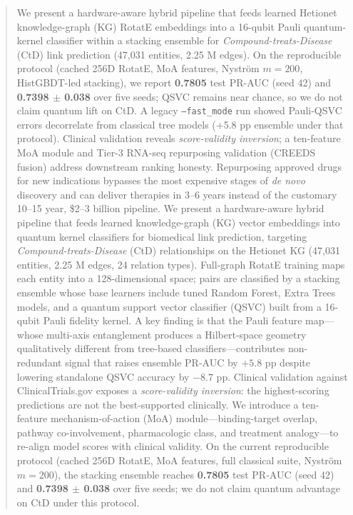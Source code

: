 \maketitle

\begin{abstract}
\ifqceshort
We present a hardware-aware hybrid pipeline that feeds learned Hetionet
knowledge-graph (KG) RotatE embeddings into a 16-qubit Pauli quantum-kernel
classifier within a stacking ensemble for \textit{Compound-treats-Disease}
(CtD) link prediction (47{,}031 entities, 2.25 M edges).
On the reproducible protocol (cached 256D RotatE, MoA features, Nystr\"{o}m
$m{=}200$, HistGBDT-led stacking), we report \textbf{0.7805} test PR-AUC
(seed 42) and \textbf{0.7398 $\pm$ 0.038} over five seeds; QSVC remains near
chance, so we do not claim quantum lift on CtD.
A legacy \texttt{--fast\_mode} run showed Pauli-QSVC errors decorrelate from
classical tree models (+5.8 pp ensemble under that protocol).
Clinical validation reveals \textit{score-validity inversion}; a ten-feature
MoA module and Tier-3 RNA-seq repurposing validation (CREEDS fusion) address
downstream ranking honesty.
\else
Repurposing approved drugs for new indications bypasses the most expensive
stages of \textit{de novo} discovery and can deliver therapies in 3--6 years
instead of the customary 10--15 year, \$2--3 billion pipeline.
We present a hardware-aware hybrid pipeline that feeds learned knowledge-graph
(KG) vector embeddings into quantum kernel classifiers for biomedical link
prediction, targeting \textit{Compound-treats-Disease} (CtD) relationships on
the Hetionet KG (47{,}031 entities, 2.25 M edges, 24 relation types).
Full-graph RotatE training maps each entity into a 128-dimensional space;
pairs are classified by a stacking ensemble whose base learners include tuned
Random Forest, Extra Trees models, and a quantum support vector classifier
(QSVC) built from a 16-qubit Pauli fidelity kernel.
A key finding is that the Pauli feature map---whose multi-axis entanglement
produces a Hilbert-space geometry qualitatively different from tree-based
classifiers---contributes non-redundant signal that raises ensemble
PR-AUC by $+5.8$ pp despite lowering standalone QSVC accuracy by $-8.7$ pp.
Clinical validation against ClinicalTrials.gov exposes a
\textit{score-validity inversion}: the highest-scoring predictions are not
the best-supported clinically.
We introduce a ten-feature mechanism-of-action (MoA) module---binding-target
overlap, pathway co-involvement, pharmacologic class, and treatment
analogy---to re-align model scores with clinical validity.
On the current reproducible protocol (cached 256D RotatE, MoA features, full
classical suite, Nystr\"{o}m $m{=}200$), the stacking ensemble reaches
\textbf{0.7805} test PR-AUC (seed 42) and \textbf{0.7398 $\pm$ 0.038} over five
seeds; we do not claim quantum advantage on CtD under this protocol.
\fi
\end{abstract}

